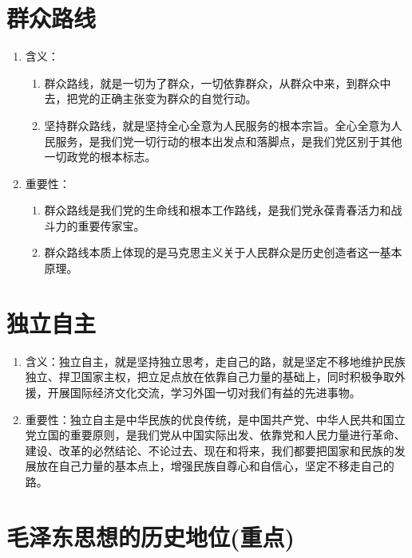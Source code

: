 \documentclass[12pt, a4paper, oneside]{ctexbook}
\begin{document}
\section{群众路线}

\begin{enumerate}
\item 含义：
\begin{enumerate}[label=(\arabic*)]
\item 群众路线，就是一切为了群众，一切依靠群众，从群众中来，到群众中去，把党的正确主张变为群众的自觉行动。

\item 坚持群众路线，就是坚持全心全意为人民服务的根本宗旨。全心全意为人民服务，是我们党一切行动的根本出发点和落脚点，是我们党区别于其他一切政党的根本标志。
\end{enumerate}

\item 重要性：
\begin{enumerate}[label=(\arabic*)]
\item 群众路线是我们党的生命线和根本工作路线，是我们党永葆青春活力和战斗力的重要传家宝。

\item 群众路线本质上体现的是马克思主义关于人民群众是历史创造者这一基本原理。
\end{enumerate}
\end{enumerate}

\section{独立自主}

\begin{enumerate}
\item 含义：独立自主，就是坚持独立思考，走自己的路，就是坚定不移地维护民族独立、捍卫国家主权，把立足点放在依靠自己力量的基础上，同时积极争取外援，开展国际经济文化交流，学习外国一切对我们有益的先进事物。

\item 重要性：独立自主是中华民族的优良传统，是中国共产党、中华人民共和国立党立国的重要原则，是我们党从中国实际出发、依靠党和人民力量进行革命、建设、改革的必然结论、不论过去、现在和将来，我们都要把国家和民族的发展放在自己力量的基本点上，增强民族自尊心和自信心，坚定不移走自己的路。
\end{enumerate}

\section{毛泽东思想的历史地位(重点)}
\end{document}
